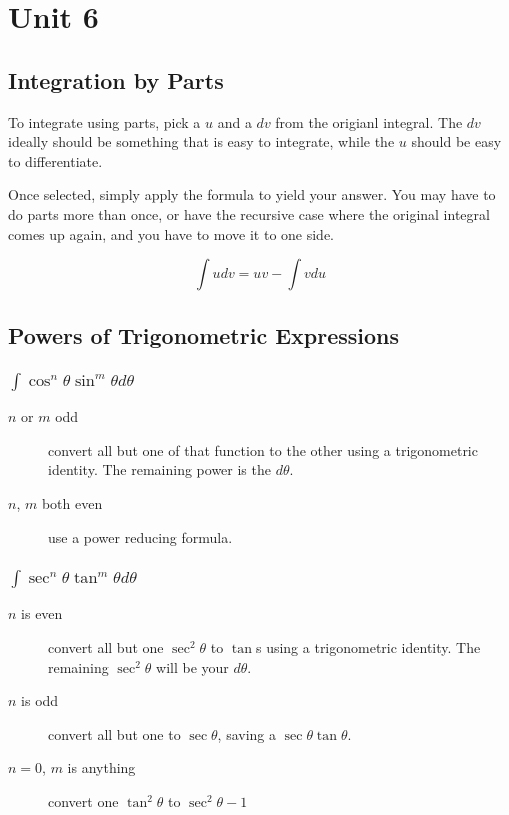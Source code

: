 \chapter{Unit 6}
\section{Integration by Parts}
To integrate using parts, pick a $u$ and a $dv$ from the origianl integral. The
$dv$ ideally should be something that is easy to integrate, while the $u$ should
be easy to differentiate.

Once selected, simply apply the formula to yield your answer. You may have to do
parts more than once, or have the recursive case where the original integral
comes up again, and you have to move it to one side.

\begin{equation}
  \int u dv = uv - \int v du
\end{equation}

\section{Powers of Trigonometric Expressions}
\subsection{$\int \cos^n\theta\sin^m\theta d\theta$}
\begin{description}
  \item[$n$ or $m$ odd] convert all but one of that function to the other using
    a trigonometric identity. The remaining power is the $d\theta$.
  \item[$n$, $m$ both even] use a power reducing formula.
\end{description}

\subsection{$\int \sec^n\theta\tan^m\theta d\theta$}
\begin{description}
  \item[$n$ is even] convert all but one $\sec^2\theta$ to $\tan$s using a
    trigonometric identity. The remaining $\sec^2\theta$ will be your $d\theta$.
  \item[$n$ is odd] convert all but one to $\sec\theta$, saving a
    $\sec\theta\tan\theta$.
  \item[$n=0$, $m$ is anything] convert one $\tan^2\theta$ to $\sec^2\theta-1$
\end{description}

